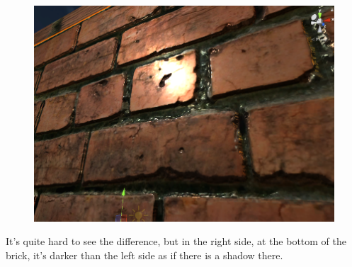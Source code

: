 \documentclass[a4paper, 13pt]{extarticle}
\begin{document}
{\begin{figure}[h]
\begin{minipage}{.45\textwidth}
		\includegraphics[width=0.9\linewidth]{intructions/with_occlusion.png}
		\centering
		\label{fig:test25}
	\end{minipage}
 
\end{figure}
It's quite hard to see the difference, but in the right side, at the bottom of the brick, it's darker than the left side as if there is a shadow there.

}
\end{document}
